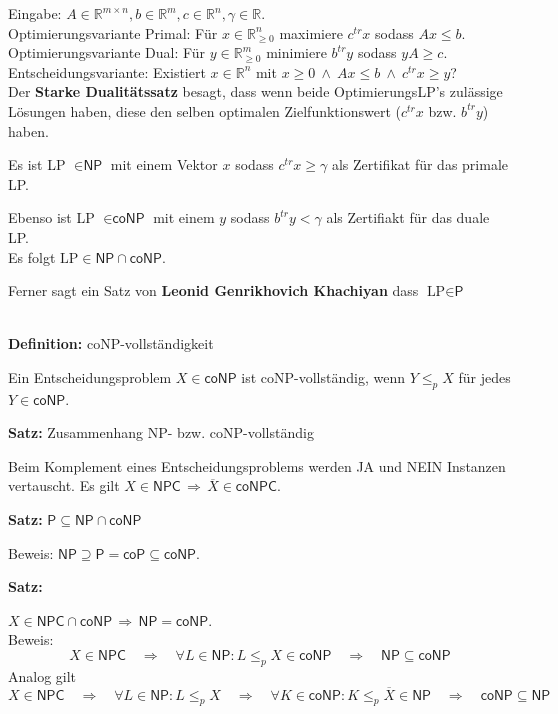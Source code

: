 \documentclass[a4paper,graphics,11pt]{article}
\begin{document}
Eingabe: $A \in \mathbb{R}^{m \times n}, b \in \mathbb{R}^m, c \in \mathbb{R}^n, \gamma \in \mathbb{R}$.
\\[10pt]
Optimierungsvariante Primal: Für $x \in \mathbb{R}^n_{\geq 0}$ maximiere $c^{tr}x$ sodass $Ax \leq b$.
\\[10pt]
Optimierungsvariante Dual: Für $y \in \mathbb{R}^m_{\geq 0}$ minimiere $b^{tr}y$ sodass $yA \geq c$.
\\[10pt]
Entscheidungsvariante: Existiert $x \in \mathbb{R}^n$ mit $x \geq 0\ \land\ Ax \leq b\ \land\ c^{tr}x \geq y$?
\\[30pt]
Der \textbf{Starke Dualitätssatz} besagt, dass wenn beide OptimierungsLP's zulässige Lösungen haben,
diese den selben optimalen Zielfunktionswert ($c^{tr}x$ bzw. $b^{tr}y$) haben.

Es ist LP $\in \textsf{NP}$ mit einem Vektor $x$ sodass $c^{tr}x \geq \gamma$ als Zertifikat für das primale LP.

Ebenso ist LP $\in \textsf{coNP}$ mit einem $y$ sodass $b^{tr}y < \gamma$ als Zertifiakt für das duale LP.
\\[30pt]
Es folgt $\text{LP} \in \textsf{NP} \cap \textsf{coNP}$.

Ferner sagt ein Satz von \textbf{Leonid Genrikhovich Khachiyan} dass $\text{LP} \in \textsf{P}$

\strut\\

\textbf{Definition:} \textsf{coNP}-vollständigkeit

Ein Entscheidungsproblem $X \in \textsf{coNP}$ ist \textsf{coNP}-vollständig, wenn $Y \leq_p X$ für jedes
$Y \in \textsf{coNP}$.

\strut

\textbf{Satz:} Zusammenhang \textsf{NP}- bzw. \textsf{coNP}-vollständig

Beim Komplement eines Entscheidungsproblems werden JA und NEIN Instanzen vertauscht.
Es gilt $X \in \textsf{NPC} \,\Longrightarrow\, \overline{X} \in \textsf{coNPC}$.

\strut

\textbf{Satz:} $\textsf{P} \subseteq \textsf{NP} \cap \textsf{coNP}$

Beweis: $\textsf{NP} \supseteq \textsf{P} = \textsf{coP} \subseteq \textsf{coNP}$.

\strut

\textbf{Satz:}

$X \in \textsf{NPC} \cap\textsf{coNP} \,\Longrightarrow\, \textsf{NP} = \textsf{coNP}$.\\
Beweis:
$$
    X \in \textsf{NPC}
    \quad \Longrightarrow\quad \forall L \in \textsf{NP}: L \leq_p X \in \textsf{coNP}
    \quad \Longrightarrow\quad \textsf{NP} \subseteq \textsf{coNP}
$$
Analog gilt
$$
    X \in \textsf{NPC}
    \quad \Longrightarrow\quad  \forall L \in \textsf{NP}: L \leq_p X
    \quad \Longrightarrow\quad  \forall K \in \textsf{coNP}: K \leq_p \overline{X} \in \textsf{NP}
    \quad \Longrightarrow\quad  \textsf{coNP} \subseteq \textsf{NP}
$$
\end{document}
